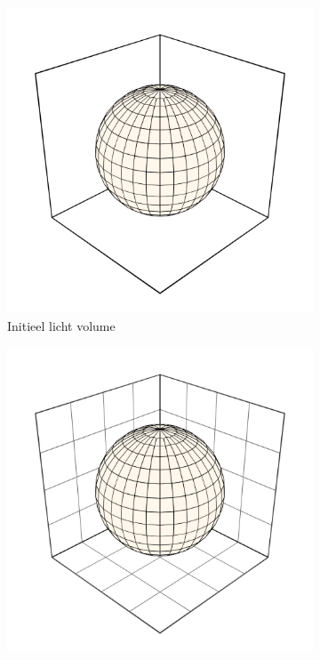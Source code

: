 \begin{figure}[p]

  \begin{subfigure}[b]{.3\linewidth}
    \includegraphics[width=\textwidth]{./img/raw/hs-slt-algorithm/hs-slt-algorithm-1.png}%
    \caption{Initieel licht volume}%
    \label{fig:hs-p1a}%
  \end{subfigure}
  \begin{subfigure}[b]{.3\linewidth}
    \includegraphics[width=\textwidth]{./img/raw/hs-slt-algorithm/hs-slt-algorithm-2.png}%

\end{subfigure}
\end{figure}
